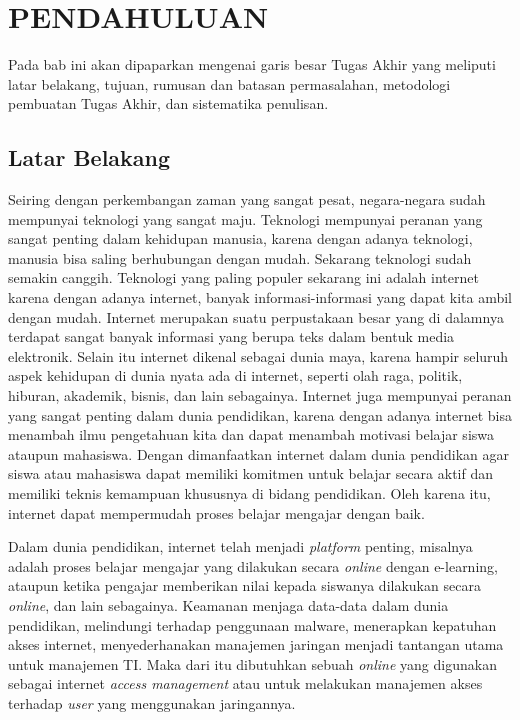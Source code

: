 \chapter{PENDAHULUAN}
Pada bab ini akan dipaparkan mengenai garis besar Tugas Akhir yang meliputi latar belakang, tujuan, rumusan dan batasan permasalahan, metodologi pembuatan Tugas Akhir, dan sistematika penulisan.

\section{Latar Belakang}
Seiring dengan perkembangan zaman yang sangat pesat, negara-negara sudah mempunyai teknologi yang sangat maju. Teknologi mempunyai peranan yang sangat penting dalam kehidupan manusia, karena dengan adanya teknologi, manusia bisa saling berhubungan dengan mudah. Sekarang teknologi sudah semakin canggih. Teknologi yang paling populer sekarang ini adalah internet karena dengan adanya internet, banyak informasi-informasi yang dapat kita ambil dengan mudah. Internet merupakan suatu perpustakaan besar yang di dalamnya terdapat sangat banyak informasi yang berupa teks dalam bentuk media elektronik. Selain itu internet dikenal sebagai dunia maya, karena hampir seluruh aspek kehidupan di dunia nyata ada di internet, seperti olah raga, politik, hiburan, akademik, bisnis, dan lain sebagainya. Internet juga mempunyai peranan yang sangat penting dalam dunia pendidikan, karena dengan adanya internet bisa menambah ilmu pengetahuan kita dan dapat menambah motivasi belajar siswa ataupun mahasiswa. Dengan dimanfaatkan internet dalam dunia pendidikan agar siswa atau mahasiswa dapat memiliki komitmen untuk belajar secara aktif dan memiliki teknis kemampuan khususnya di bidang pendidikan. Oleh karena itu, internet dapat mempermudah proses belajar mengajar dengan baik.

Dalam dunia pendidikan, internet telah menjadi \textit{platform} penting, misalnya adalah proses belajar mengajar yang dilakukan secara \textit{online} dengan e-learning, ataupun ketika pengajar memberikan nilai kepada siswanya dilakukan secara \textit{online}, dan lain sebagainya. Keamanan menjaga data-data dalam dunia pendidikan, melindungi terhadap penggunaan malware, menerapkan kepatuhan akses internet, menyederhanakan manajemen jaringan menjadi tantangan utama untuk manajemen TI. Maka dari itu dibutuhkan sebuah \textit{online} yang digunakan sebagai internet \textit{access management} atau untuk melakukan manajemen akses terhadap \textit{user} yang menggunakan jaringannya.

